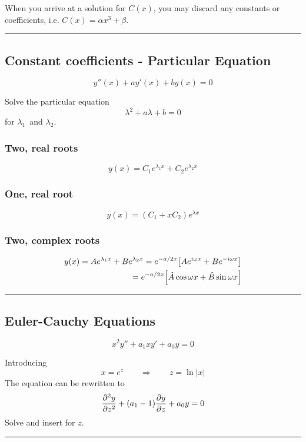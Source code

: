 \documentclass[10pt,a4paper]{article}
\renewcommand{\exp}{e^}
\newcommand{\holine}{\rule{286pt}{1pt}}
\begin{document}
\begin{multicols}{2}
When you arrive at a solution for $C(x)$, you may discard any constants or coefficients, i.e. $C(x) = \alpha x^3 + \beta$.


\holine
\subsection*{Constant coefficients - Particular Equation}
\[
    y''(x) + ay'(x) + by(x) = 0
\]

Solve the particular equation
\[
    \lambda^2 + a\lambda + b = 0
\]
for $\lambda_1$ and $\lambda_2$.


\subsubsection*{Two, real roots}
\[
    y(x) = C_1\exp{\lambda_1 x} + C_2\exp{\lambda_2 x}
\]


\subsubsection*{One, real root}
\[
    y(x) = (C_1 + xC_2)\exp{\lambda x}
\]


\subsubsection*{Two, complex roots}
\begin{equation*}
\begin{split}
    y(x) = A\exp{\lambda_1 x} + B\exp{\lambda_2 x} = \exp{-a/2 x}\qty[A\exp{i\omega x} + B\exp{-i\omega x}] \\
    =\exp{-a/2 x}\qty[\hat{A}\cos{\omega x} + \hat{B}\sin{\omega x}]
\end{split}
\end{equation*}


\holine
\subsection*{Euler-Cauchy Equations}
\[
    x^2y'' + a_1x y' + a_0 y = 0
\]

Introducing
\[
    x = \exp{z} \quad\quad\Rightarrow\quad\quad z = \ln|x|
\]
The equation can be rewritten to
\[
    \pdv[2]{y}{z} + (a_1-1)\pdv{y}{z} + a_0 y = 0
\]
Solve and insert for $z$.



\holine

\end{multicols}
\end{document}
